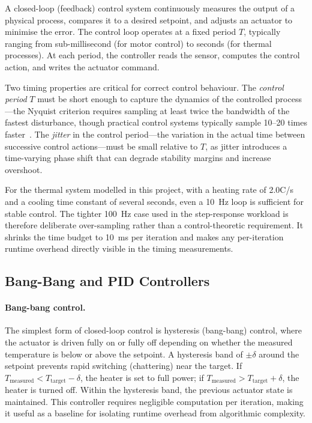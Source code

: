 \documentclass[12pt, a4paper]{report}
\begin{document}
A closed-loop (feedback) control system continuously measures the output of a physical process, compares it to a desired setpoint, and adjusts an actuator to minimise the error. The control loop operates at a fixed period $T$, typically ranging from sub-millisecond (for motor control) to seconds (for thermal processes). At each period, the controller reads the sensor, computes the control action, and writes the actuator command.

Two timing properties are critical for correct control behaviour. The \textit{control period} $T$ must be short enough to capture the dynamics of the controlled process---the Nyquist criterion requires sampling at least twice the bandwidth of the fastest disturbance, though practical control systems typically sample 10--20 times faster~\cite{astrom-feedback}. The \textit{jitter} in the control period---the variation in the actual time between successive control actions---must be small relative to $T$, as jitter introduces a time-varying phase shift that can degrade stability margins and increase overshoot.

For the thermal system modelled in this project, with a heating rate of 2.0\textdegree C/s and a cooling time constant of several seconds, even a 10~Hz loop is sufficient for stable control. The tighter 100~Hz case used in the step-response workload is therefore deliberate over-sampling rather than a control-theoretic requirement. It shrinks the time budget to 10~ms per iteration and makes any per-iteration runtime overhead directly visible in the timing measurements.

\subsection{Bang-Bang and PID Controllers}
\label{subsec:controllers}

\paragraph{Bang-bang control.} The simplest form of closed-loop control is hysteresis (bang-bang) control, where the actuator is driven fully on or fully off depending on whether the measured temperature is below or above the setpoint. A hysteresis band of $\pm\delta$ around the setpoint prevents rapid switching (chattering) near the target. If $T_{\text{measured}} < T_{\text{target}} - \delta$, the heater is set to full power; if $T_{\text{measured}} > T_{\text{target}} + \delta$, the heater is turned off. Within the hysteresis band, the previous actuator state is maintained. This controller requires negligible computation per iteration, making it useful as a baseline for isolating runtime overhead from algorithmic complexity.
\end{document}
